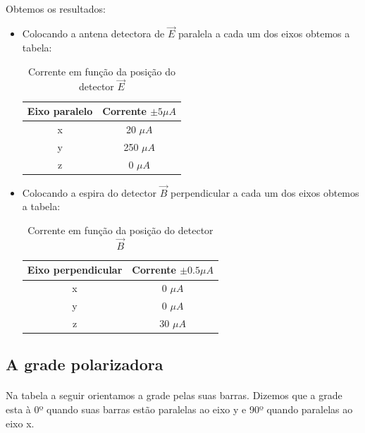 \documentclass[a4paper,11pt]{article}
\begin{document}
	\paragraph{}Obtemos os resultados:
	\begin{itemize}
	

		\item Colocando a antena detectora de $ \vec{E} $ paralela a cada um dos eixos obtemos a tabela:

	\begin{table}[!htp]
		\centering	
		\begin{tabular}{|c|c|}\hline
		Eixo paralelo & Corrente $\pm 5 \mu A$  \\ \hline 
		x & 20 $\mu A$ \\ \hline
		y & 250 $\mu A$\\ \hline
		z & 0 $\mu A$\\ \hline	
		\end{tabular}
		\caption{Corrente em função da posição do detector $ \vec{E} $}
		\label{E-tab}
	\end{table}
	
	\item Colocando a espira do detector $ \vec{B} $ perpendicular a cada um dos eixos obtemos a tabela:
	\begin{table}[!htp]
		\centering	
		\begin{tabular}{|c|c|}\hline
		Eixo perpendicular & Corrente $\pm 0.5 \mu A$ \\ \hline 
		x & 0 $\mu A$ \\ \hline
		y & 0 $\mu A$\\ \hline
		z & 30 $\mu A$\\ \hline	
		\end{tabular}
		\caption{Corrente em função da posição do detector $ \vec{B} $}
		\label{B-tab}
	\end{table}


	\end{itemize}
	

\subsection{A grade polarizadora}
	\paragraph{}Na tabela a seguir orientamos a grade pelas suas barras. Dizemos que a grade esta à 0º quando suas barras estão paralelas ao eixo y e 90º quando paralelas ao eixo x.
	
\end{document}

